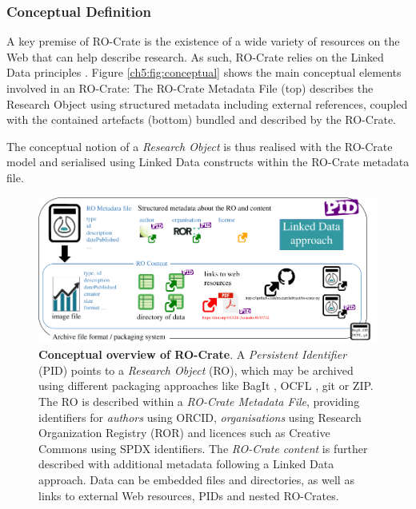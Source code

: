 \subsubsection{Conceptual Definition}\label{ch5:conceptual}

A key premise of RO-Crate is the existence of a wide variety of
resources on the Web that can help describe research. As such, RO-Crate
relies on the Linked Data principles
\cite{ch5-63}.
Figure \vref{ch5:fig:conceptual} shows the main conceptual
elements involved in an RO-Crate: The RO-Crate Metadata File (top)
describes the Research Object using structured metadata including
external references, coupled with the contained artefacts (bottom)
bundled and described by the RO-Crate.

The conceptual notion of a \emph{Research Object}
\cite{ch5-12}
is thus realised with the RO-Crate model and serialised using Linked
Data constructs within the RO-Crate metadata file.


\begin{figure}%
  \includegraphics[width=\textwidth]{figures/ch05/ro-crate-overview.pdf}
  \caption{\textbf{Conceptual overview of RO-Crate}. A \emph{Persistent
  Identifier} (PID) \cite{ch5-86} points to a
  \emph{Research Object} (RO), which may be archived using different
  packaging approaches like BagIt \cite{ch5-74}, OCFL \cite
  {ch5-96}, git or ZIP. The RO is described within a \emph{RO-Crate
  Metadata File}, providing identifiers for \emph{authors} using ORCID,
  \emph{organisations} using Research Organization Registry (ROR) \cite
  {ch5-79} and licences such as Creative Commons using SPDX
  identifiers. The \emph{RO-Crate content} is further described with
  additional metadata following a Linked Data approach. Data can be
  embedded files and directories, as well as links to external Web
  resources, PIDs and nested RO-Crates.}
  \label{ch5:fig:conceptual}
\end{figure}

